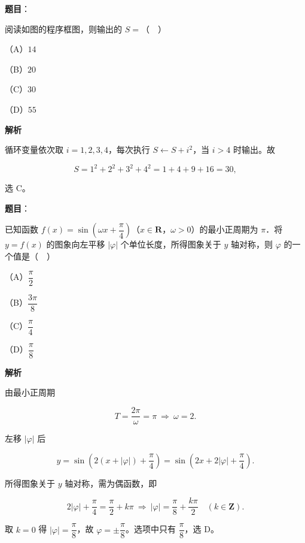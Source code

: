 \begin{answer}

\textbf{题目}：

阅读如图的程序框图，则输出的 $S=$（　）
\nopagebreak[4]
\begin{center}\end{center}
\nopagebreak[4]
（A）$14$

（B）$20$

（C）$30$

（D）$55$

\textbf{解析}

循环变量依次取 $i=1,2,3,4$，每次执行 $S\leftarrow S+i^2$，当 $i>4$ 时输出。故

\nopagebreak[4]
\[S=1^2+2^2+3^2+4^2=1+4+9+16=30,\]

选 C。


\end{answer}
\begin{answer}

\textbf{题目}：

已知函数 $f(x)=\sin\left(\omega x+\dfrac{\pi}{4}\right)$（$x\in\mathbf R$，$\omega>0$）的最小正周期为 $\pi$．将 $y=f(x)$ 的图象向左平移 $|\varphi|$ 个单位长度，所得图象关于 $y$ 轴对称，则 $\varphi$ 的一个值是（　）

（A）$\dfrac{\pi}{2}$

（B）$\dfrac{3\pi}{8}$

（C）$\dfrac{\pi}{4}$

（D）$\dfrac{\pi}{8}$

\textbf{解析}

由最小正周期

\nopagebreak[4]
\[T=\frac{2\pi}{\omega}=\pi\ \Longrightarrow\ \omega=2 .\]

左移 $|\varphi|$ 后

\nopagebreak[4]
\[y=\sin\left(2(x+|\varphi|)+\frac\pi4\right)
=\sin\left(2x+2|\varphi|+\frac\pi4\right).\]

所得图象关于 $y$ 轴对称，需为偶函数，即

\nopagebreak[4]
\[2|\varphi|+\frac\pi4=\frac\pi2+k\pi
\ \Longrightarrow\ |\varphi|=\frac\pi8+\frac{k\pi}{2}\quad(k\in\mathbf Z).\]

取 $k=0$ 得 $|\varphi|=\dfrac\pi8$，故 $\varphi=\pm\dfrac\pi8$。选项中只有 $\dfrac\pi8$，选 D。


\end{answer}

